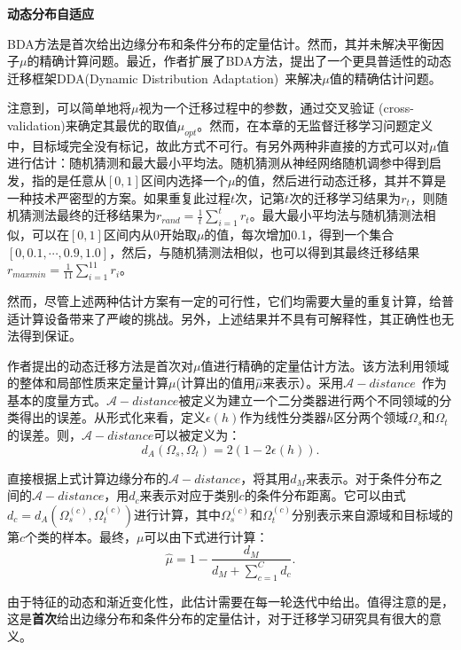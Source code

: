 \textbf{动态分布自适应}

BDA方法是首次给出边缘分布和条件分布的定量估计。然而，其并未解决平衡因子$\mu$的精确计算问题。最近，作者扩展了BDA方法，提出了一个更具普适性的动态迁移框架DDA(Dynamic Distribution Adaptation)~\cite{wang2019transfer}来解决$\mu$值的精确估计问题。

注意到，可以简单地将$\mu$视为一个迁移过程中的参数，通过交叉验证 (cross-validation)来确定其最优的取值$\mu_{opt}$。然而，在本章的无监督迁移学习问题定义中，目标域完全没有标记，故此方式不可行。有另外两种非直接的方式可以对$\mu$值进行估计：随机猜测和最大最小平均法。随机猜测从神经网络随机调参中得到启发，指的是任意从$[0,1]$区间内选择一个$\mu$的值，然后进行动态迁移，其并不算是一种技术严密型的方案。如果重复此过程$t$次，记第$t$次的迁移学习结果为$r_t$，则随机猜测法最终的迁移结果为$r_{rand} = \frac{1}{t} \sum_{i=1}^{t} r_t$。最大最小平均法与随机猜测法相似，可以在$[0,1]$区间内从0开始取$\mu$的值，每次增加0.1，得到一个集合$[0,0.1,\cdots,0.9,1.0]$，然后，与随机猜测法相似，也可以得到其最终迁移结果$r_{maxmin}=\frac{1}{11} \sum_{i=1}^{11} r_i$。

然而，尽管上述两种估计方案有一定的可行性，它们均需要大量的重复计算，给普适计算设备带来了严峻的挑战。另外，上述结果并不具有可解释性，其正确性也无法得到保证。

作者提出的动态迁移方法是首次对$\mu$值进行精确的定量估计方法。该方法利用领域的整体和局部性质来定量计算$\mu$(计算出的值用$\hat{\mu}$来表示）。采用$\mathcal{A}-distance$~\cite{ben2007analysis}作为基本的度量方式。$\mathcal{A}-distance$被定义为建立一个二分类器进行两个不同领域的分类得出的误差。从形式化来看，定义$\epsilon(h)$作为线性分类器$h$区分两个领域$\Omega_s$和$\Omega_t$的误差。则，$\mathcal{A}-distance$可以被定义为：
\begin{equation}
d_A(\Omega_s,\Omega_t) = 2(1 - 2 \epsilon(h)).
\end{equation}

直接根据上式计算边缘分布的$\mathcal{A}-distance$，将其用$d_M$来表示。对于条件分布之间的$\mathcal{A}-distance$，用$d_c$来表示对应于类别$c$的条件分布距离。它可以由式$d_c = d_A(\Omega^{(c)}_s,\Omega^{(c)}_t)$进行计算，其中$\Omega^{(c)}_s$和$\Omega^{(c)}_t$分别表示来自源域和目标域的第$c$个类的样本。最终，$\mu$可以由下式进行计算：
\begin{equation}
\label{eq-meda-mu}
\hat{\mu} = 1 - \frac{d_M}{d_M + \sum_{c=1}^{C} d_c}.
\end{equation}

由于特征的动态和渐近变化性，此估计需要在每一轮迭代中给出。值得注意的是，这是\textbf{首次}给出边缘分布和条件分布的定量估计，对于迁移学习研究具有很大的意义。

